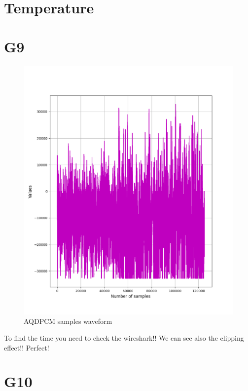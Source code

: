 \documentclass[hidelinks, 12pt, a4paper]{article}
\begin{document}
\section{Temperature}



\section{G9}

\begin{figure}[h!]
\centering
	\includegraphics[height=.4\textheight, width=\textwidth]{assets/session1/g9_aq.png}
	\caption{AQDPCM samples waveform} 
\end{figure}

To find the time you need to check the wireshark!! We can see also the clipping effect!! Perfect!

\section{G10}
\end{document}
